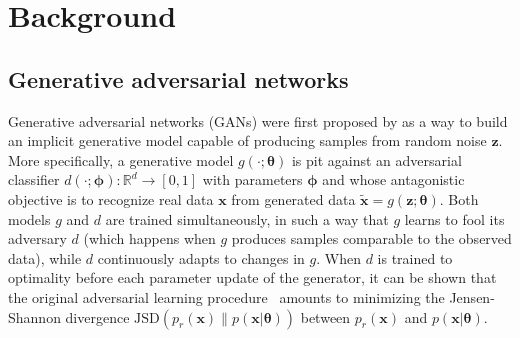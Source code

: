 \documentclass[twocolumn,superscriptaddress,aps]{revtex4-1}
\newcommand{\bftheta}{{\bm \theta}}
\newcommand{\bfphi}{{\bm \phi}}
\newcommand{\bfz}{\mathbf{z}}
\theoremstyle{plain}
\begin{document}

\section{Background}

\subsection{Generative adversarial networks}
\label{sec:gans}

Generative adversarial networks (GANs) were first proposed by
\cite{goodfellow2014generative} as a way to build an implicit generative model
capable of producing samples from random noise $\bfz$. More specifically,
a generative model $g(\cdot; \bftheta)$ is pit against an adversarial
classifier $d(\cdot; \bfphi):\mathbb{R}^d \to [0,1]$ with parameters $\bfphi$ and whose antagonistic objective is to recognize real data $\mathbf{x}$
from generated data $\tilde{\mathbf{x}} = g(\bfz; \bftheta)$. Both models $g$ and $d$
are trained simultaneously, in such a way that $g$ learns to fool
its adversary $d$ (which happens when $g$ produces samples comparable to the
observed data), while $d$ continuously adapts to changes in $g$. When $d$ is
trained to optimality before each parameter update of the generator, it can
be shown that the original adversarial learning procedure~\cite{goodfellow2014generative} amounts to minimizing
the Jensen-Shannon divergence $\text{JSD}(p_r(\mathbf{x}) \parallel p(\mathbf{x}|\bftheta))$ between $p_r(\mathbf{x})$ and $p(\mathbf{x}|\bftheta)$.
\end{document}
